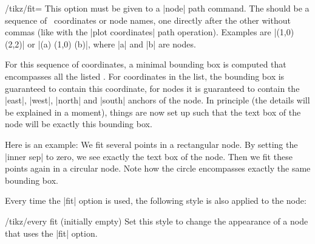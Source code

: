 \begin{key}{/tikz/fit=}
    This option must be given to a |node| path command. The  should be a sequence of \tikzname\ coordinates or node names,
    one directly after the other without commas (like with the
    |plot coordinates| path operation). Examples are |(1,0) (2,2)| or
    |(a) (1,0) (b)|, where |a| and |b| are nodes.

    For this sequence of coordinates, a minimal bounding box is computed that
    encompasses all the listed . For coordinates in
    the list, the bounding box is guaranteed to contain this coordinate, for
    nodes it is guaranteed to contain the |east|, |west|, |north| and |south|
    anchors of the node. In principle (the details will be explained in a
    moment), things are now set up such that the text box of the node will be
    exactly this bounding box.

    Here is an example: We fit several points in a rectangular node. By setting
    the |inner sep| to zero, we see exactly the text box of the node. Then we
    fit these points again in a circular node. Note how the circle encompasses
    exactly the same bounding box.
\begin{codeexample}[preamble={\usetikzlibrary{fit}}]
\end{codeexample}

    Every time the |fit| option is used, the following style is also applied to
    the node:
    \begin{stylekey}{/tikz/every fit (initially \normalfont empty)}
        Set this style to change the appearance of a node that uses the |fit|
        option.
    \end{stylekey}


\end{key}
